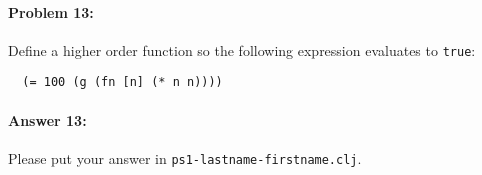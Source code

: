 \documentclass[10pt]{article}
\newcommand{\required}[1]{{\color{blue}{#1}}}
\newcommand{\PSnum}{1}
\begin{document}
\noindent\hrulefill%

\paragraph{Problem 13:} Define a higher order function \required{\texttt{g}} so
the following expression evaluates to \texttt{true}:
\begin{lstlisting}
  (= 100 (g (fn [n] (* n n))))
\end{lstlisting}

\paragraph{Answer 13:} Please put your answer in
\texttt{ps\PSnum-lastname-firstname.clj}.

\noindent\hrulefill%
\end{document}
